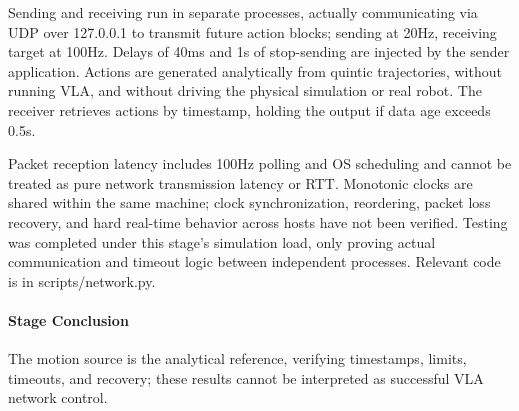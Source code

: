 Sending and receiving run in separate processes, actually communicating via UDP over 127.0.0.1 to transmit future action blocks; sending at 20Hz, receiving target at 100Hz. Delays of 40ms and 1s of stop-sending are injected by the sender application. Actions are generated analytically from quintic trajectories, without running VLA, and without driving the physical simulation or real robot. The receiver retrieves actions by timestamp, holding the output if data age exceeds 0.5s.

Packet reception latency includes 100Hz polling and OS scheduling and cannot be treated as pure network transmission latency or RTT. Monotonic clocks are shared within the same machine; clock synchronization, reordering, packet loss recovery, and hard real-time behavior across hosts have not been verified. Testing was completed under this stage's simulation load, only proving actual communication and timeout logic between independent processes. Relevant code is in scripts/network.py.


\paragraph{Stage Conclusion} The motion source is the analytical reference, verifying timestamps, limits, timeouts, and recovery; these results cannot be interpreted as successful VLA network control.


\FloatBarrier
